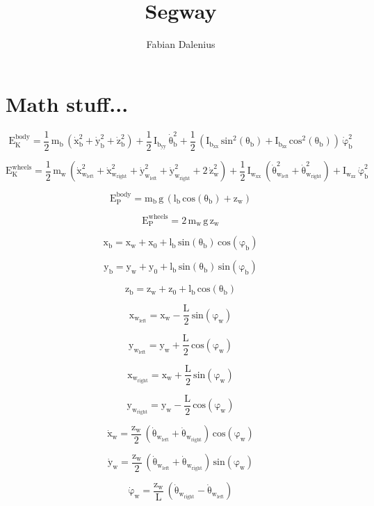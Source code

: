 \documentclass[11pt]{article}
\title{Segway}
\author{Fabian Dalenius}
\date{}
\begin{document}
\maketitle

\section{Math stuff...}

\[
  \mathrm{
    E_K^{body} = \frac{1}{2} \, m_b \, ( \dot{x}_b^2 + \dot{y}_b^2 + \dot{z}_b^2 ) + \frac{1}{2} \, I_{b_{yy}} \, \dot{\theta}_b^2+ \frac{1}{2} \, ( I_{b_{xx}} \, sin^2(\theta_b) + I_{b_{zz}} \, cos^2(\theta_b) ) \, \dot{\varphi}_b^2
  }
\]

\[
  \mathrm{
    E_K^{wheels} = \frac{1}{2} \, m_w \, ( \dot{x}_{w_{left}}^2 + \dot{x}_{w_{right}}^2 + \dot{y}_{w_{left}}^2 + \dot{y}_{w_{right}}^2 + 2 \, \dot{z}_w^2 ) + \frac{1}{2} \, I_{w_{xx}} \, ( \dot{\theta}_{w_{left}}^2 + \dot{\theta}_{w_{right}}^2 ) + I_{w_{zz}} \, \dot{\varphi}_b^2
  }
\]

\[
  \mathrm{
    E_P^{body} = m_b \, g \, ( l_b \, cos(\theta_b) + z_w )
  }
\]

\[
  \mathrm{
    E_P^{wheels} = 2 \, m_w \, g \, z_w
  }
\]

\[
  \mathrm{
    x_b = x_w + x_0 + l_b \, sin(\theta_b) \, cos(\varphi_b)
  }
\]

\[
  \mathrm{
    y_b = y_w + y_0 + l_b \, sin(\theta_b) \, sin(\varphi_b)
  }
\]

\[
  \mathrm{
    z_b = z_w + z_0 + l_b \, cos(\theta_b)
  }
\]

\[
 \mathrm{
   x_{w_{left}} = x_w - \frac{L}{2} \, sin(\varphi_w)
 } 
\]

\[
 \mathrm{
   y_{w_{left}} = y_w + \frac{L}{2} \, cos(\varphi_w)
 } 
\]

\[
 \mathrm{
   x_{w_{right}} = x_w + \frac{L}{2} \, sin(\varphi_w)
 } 
\]

\[
 \mathrm{
   y_{w_{right}} = y_w - \frac{L}{2} \, cos(\varphi_w)
 } 
\]

\[
  \mathrm{
    \dot{x}_w = \frac{z_w}{2} \, ( \dot{\theta}_{w_{left}} + \dot{\theta}_{w_{right}} ) \, cos(\varphi_w)
  }
\]

\[
  \mathrm{
    \dot{y}_w = \frac{z_w}{2} \, ( \dot{\theta}_{w_{left}} + \dot{\theta}_{w_{right}} ) \, sin(\varphi_w)
  }
\]

\[
  \mathrm{
    \dot{\varphi}_w = \frac{z_w}{L} \, ( \dot{\theta}_{w_{right}} - \dot{\theta}_{w_{left}} )
  }
\]
\end{document}
